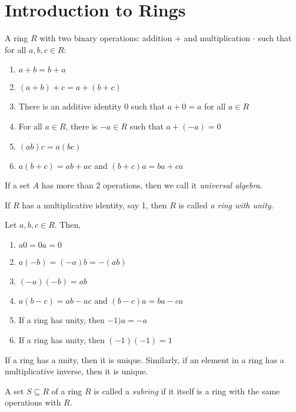 \chapter{Introduction to Rings}

\begin{definition}[Rings]
    A ring \(R\) with two binary operations: addition \(+\) and multiplication \(\cdot\) such that for all \(a, b, c \in R\):
    \begin{enumerate}
        \item \(a + b = b + a\)
        \item \((a + b) + c = a + (b + c)\)
        \item There is an additive identity \(0\) such that \(a + 0 = a\) for all \(a \in R\)
        \item For all \(a \in R\), there is \(-a \in R\) such that \(a + (-a) = 0\)
        \item \((ab)c = a(bc)\)
        \item \(a(b+c) = ab + ac\) and \((b+c)a = ba + ca\)
    \end{enumerate}
\end{definition}

\begin{remark}
    If a set \(A\) has more than 2 operations, then we call it \textit{universal algebra}.
\end{remark}

\begin{remark}
    If \(R\) has a multiplicative identity, say 1, then \(R\) is called \textit{a ring with unity}.
\end{remark}

\begin{theorem}
    Let \(a, b, c \in R\). Then,
    \begin{enumerate}
        \item \(a0 = 0a = 0\)
        \item \(a(-b) = (-a)b = -(ab)\)
        \item \((-a)(-b) = ab\)
        \item \(a(b-c) = ab - ac\) and \((b-c)a = ba - ca\)
        \item If a ring has unity, then \(-1)a = -a\)
        \item If a ring has unity, then \((-1)(-1) = 1\)
    \end{enumerate}
\end{theorem}

\begin{theorem}
    If a ring has a unity, then it is unique. Similarly, if an element in a ring has a multiplicative inverse, then it is unique.
\end{theorem}

\begin{definition}[Subring]
    A set \(S \subseteq R\) of a ring \(R\) is called a \textit{subring} if it itself is a ring with the same operations with \(R\).
\end{definition}
